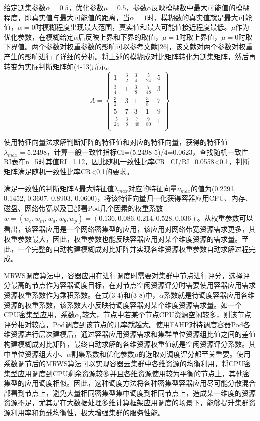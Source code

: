 给定割集参数$\alpha=0.5$，优化参数$\mu=0.5$，参数$\alpha$反映模糊数中最大可能值的模糊程度，即真实值与最大可能值的距离，当$\alpha=1$时，模糊数的真实值就是最大可能值，$\alpha=0$时模糊程度出现最大范围，真实值和最大可能值接近程度最低。$\mu$作为优化参数，在模糊给定$\alpha$后反映上界和下界的取值，$\mu=1$时取上界值，$\mu=0$时取下界值。两个参数对权重参数的影响可以参考文献[26]，该文献对两个参数对权重产生的影响进行了详细的分析。将上述的模糊成对比矩阵转化为割集矩阵，然后再转变为实际判断矩阵如(4-13)所示。
\begin{equation}
A = \left\{\begin{array}{ccccc}
1 & \frac{3}{2} & \frac{3}{4} & \frac{5}{24} & 5 \\
\frac{3}{4} & 1 & \frac{3}{8} & \frac{7}{48} & 3 \\
\frac{3}{2} & 3 & 1 & \frac{3}{8} & 7 \\
5 & 7 & 3 & 1 & 9 \\
\frac{5}{24} & \frac{3}{8} & \frac{7}{48} & \frac{9}{80} & 1 \\
\end{array}\right\}
\end{equation}

使用特征向量法求解判断矩阵的特征值和对应的特征向量，获得的特征值$\lambda_{max}=5.2498$，计算一般一致性指标CI=(5.2498-5)/4=0.0623，查找随机一致性RI表在n=5时其值RI=1.12，因此随机一致性比率CR=CI/RI=0.0558<0.1，判断矩阵满足随机一致性比率CR<0.1的要求。

满足一致性的判断矩阵A最大特征值$\lambda_{max}$对应的特征向量$\nu_{max}$的值为(0.2291, 0.1452, 0.3607, 0.8903, 0.0600)，将该特征向量归一化获得容器应用CPU、内存、磁盘、网络带宽以及已部署Pod几个因素的权重系数$w=(w_{c}, w_{m}, w_{d}, w_{b}, w_{p})=(0.136, 0.086, 0.214, 0.528, 0.036)$。从权重参数可以看出，该容器应用是一个网络密集型的应用，该应用对网络带宽资源需求更多，其权重参数最大，因此，权重参数也能反映容器应用对某个维度资源的需求量。至此，一个完整的自动构建模糊成对比矩阵并实现各维资源权重参数自动求解过程完成。

MRWS调度算法中，容器应用在进行调度时需要对集群中节点进行评分，选择评分最高的节点作为容器调度目标，在对节点空闲资源评分时需要使用容器应用需求资源权重系数作为乘积系数。在式(3-4)和(3-8)中，$\alpha$系数就是待调度容器应用各维资源的权重系数，该系数大小反映待调度容器对某个维度资源需求量。如一个CPU密集型应用，系数$\alpha_{1}$较大，节点中若某个节点CPU资源空闲较多，则该节点评分相对较高，Pod调度到该节点的几率就越大。使用FAHP对待调度容器Pod各维资源进行层次建模后，通过容器应用资源需求和集群单位资源组比值之间的差值构建模糊成对比矩阵，最终自动求解的各维资源权重值就是空闲资源评分系数。其中单位资源组大小、$\alpha$割集系数和优化参数$\mu$的选取对调度评分都至关重要。使用系数调节后的MRWS算法可以实现容器云集群中各维资源的均衡利用，将CPU密集型应用调度到CPU剩余资源较多并且各维资源使用较为平衡的节点上，其他密集型的应用调度相似。因此，这种调度方法将各种密集型容器应用尽可能分散混合部署到节点上，避免大量相同密集型集中调度到相同节点上，造成某一维度的资源资源不足，尤其是在大数据处理多维计算框架应用调度的场景下，能够提升集群资源利用率和负载均衡性，极大增强集群的服务性能。


